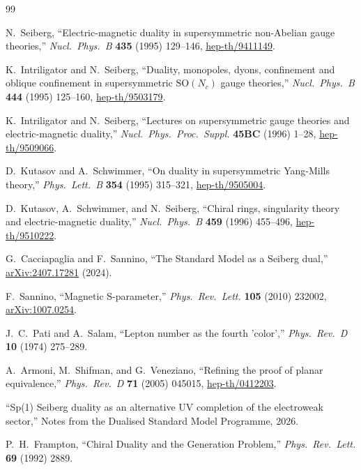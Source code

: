 \documentclass[11pt,a4paper]{article}
\theoremstyle{plain}
\theoremstyle{definition}
\theoremstyle{remark}
\newcommand{\Nc}{N_{\!c}}
\newcommand{\SO}[1]{\mathrm{SO}(#1)}
\begin{document}
\begin{thebibliography}{99}

N.~Seiberg,
``Electric-magnetic duality in supersymmetric non-Abelian gauge theories,''
\textit{Nucl.\ Phys.\ B} \textbf{435} (1995) 129--146,
\href{https://arxiv.org/abs/hep-th/9411149}{hep-th/9411149}.

K.~Intriligator and N.~Seiberg,
``Duality, monopoles, dyons, confinement and oblique confinement
in supersymmetric $\SO{\Nc}$ gauge theories,''
\textit{Nucl.\ Phys.\ B} \textbf{444} (1995) 125--160,
\href{https://arxiv.org/abs/hep-th/9503179}{hep-th/9503179}.

K.~Intriligator and N.~Seiberg,
``Lectures on supersymmetric gauge theories and electric-magnetic duality,''
\textit{Nucl.\ Phys.\ Proc.\ Suppl.} \textbf{45BC} (1996) 1--28,
\href{https://arxiv.org/abs/hep-th/9509066}{hep-th/9509066}.

D.~Kutasov and A.~Schwimmer,
``On duality in supersymmetric Yang-Mills theory,''
\textit{Phys.\ Lett.\ B} \textbf{354} (1995) 315--321,
\href{https://arxiv.org/abs/hep-th/9505004}{hep-th/9505004}.

D.~Kutasov, A.~Schwimmer, and N.~Seiberg,
``Chiral rings, singularity theory and electric-magnetic duality,''
\textit{Nucl.\ Phys.\ B} \textbf{459} (1996) 455--496,
\href{https://arxiv.org/abs/hep-th/9510222}{hep-th/9510222}.

G.~Cacciapaglia and F.~Sannino,
``The Standard Model as a Seiberg dual,''
\href{https://arxiv.org/abs/2407.17281}{arXiv:2407.17281} (2024).

F.~Sannino,
``Magnetic S-parameter,''
\textit{Phys.\ Rev.\ Lett.} \textbf{105} (2010) 232002,
\href{https://arxiv.org/abs/1007.0254}{arXiv:1007.0254}.

J.~C.~Pati and A.~Salam,
``Lepton number as the fourth 'color',''
\textit{Phys.\ Rev.\ D} \textbf{10} (1974) 275--289.

A.~Armoni, M.~Shifman, and G.~Veneziano,
``Refining the proof of planar equivalence,''
\textit{Phys.\ Rev.\ D} \textbf{71} (2005) 045015,
\href{https://arxiv.org/abs/hep-th/0412203}{hep-th/0412203}.

``Sp(1) Seiberg duality as an alternative UV completion of the
electroweak sector,''
Notes from the Dualised Standard Model Programme, 2026.

P.~H.~Frampton,
``Chiral Duality and the Generation Problem,''
\textit{Phys.\ Rev.\ Lett.} \textbf{69} (1992) 2889.

\end{thebibliography}
\end{document}
